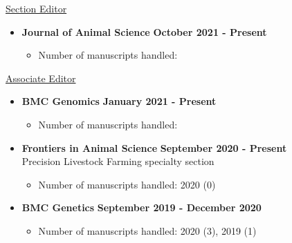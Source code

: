 \documentclass[margin,line,10pt]{res}
\begin{document}
\begin{resume}
\underline{Section Editor}
\vspace{0.2cm}

\begin{itemize}
\item {\bf Journal of Animal Science} \hfill {\bf October 2021 - Present}
  \begin{itemize}
    \item Number of manuscripts handled:
  \end{itemize}
\end{itemize}


\underline{Associate Editor}
\vspace{0.2cm}



\begin{itemize}
\item {\bf BMC Genomics} \hfill {\bf January 2021 - Present}
  \begin{itemize}
    \item Number of manuscripts handled:
  \end{itemize}
\end{itemize}

\vspace{0.3cm}

\begin{itemize}
\item {\bf Frontiers in Animal Science} \hfill {\bf September 2020 - Present} \\
   Precision Livestock Farming specialty section
  \begin{itemize}
    \item Number of manuscripts handled: 2020 (0)
  \end{itemize}
\end{itemize}

\vspace{0.3cm}

\begin{itemize}
\item {\bf BMC Genetics} \hfill {\bf September 2019 - December 2020}
  \begin{itemize}
    \item Number of manuscripts handled: 2020 (3), 2019 (1)
  \end{itemize}
\end{itemize}


\end{resume}
\end{document}
